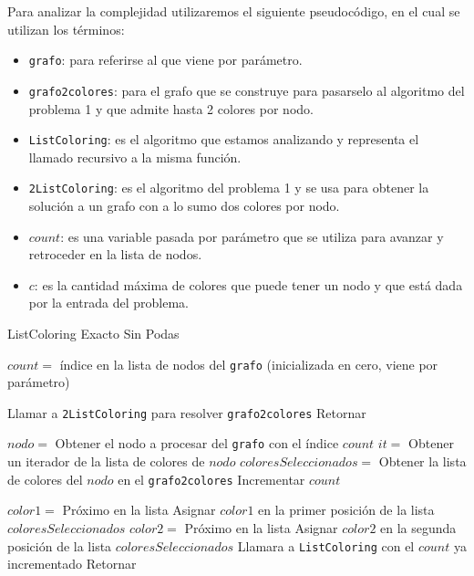 Para analizar la complejidad utilizaremos el siguiente pseudocódigo, en el cual se utilizan los términos:
\begin{itemize}
	\item \texttt{grafo}: para referirse al que viene por parámetro.
	
	\item \texttt{grafo2colores}: para el grafo que se construye para pasarselo al algoritmo del problema 1 y que admite hasta 2 colores por nodo.
	
	\item \texttt{ListColoring}: es el algoritmo que estamos analizando y representa el llamado recursivo a la misma función. 
	
	\item \texttt{2ListColoring}: es el algoritmo del problema 1 y se usa para obtener la solución a un grafo con a lo sumo dos colores por nodo.
	
	\item $count$: es una variable pasada por parámetro que se utiliza para avanzar y retroceder en la lista de nodos.
	
	\item $c$: es la cantidad máxima de colores que puede tener un nodo y que está dada por la entrada del problema.
\end{itemize}

\begin{algorithm}
\caption{ListColoring Exacto Sin Podas}
\label{lce}
\begin{algorithmic} 

\STATE $count = $ índice en la lista de nodos del \texttt{grafo} (inicializada en cero, viene por parámetro) 

	\STATE Llamar a \texttt{2ListColoring} para resolver \texttt{grafo2colores}  %
	\STATE Retornar 
\ENDIF

\STATE $nodo = $ Obtener el nodo a procesar del \texttt{grafo} con el índice $count$ 
\STATE $it = $ Obtener un iterador de la lista de colores de $nodo$ 
\STATE $coloresSeleccionados = $ Obtener la lista de colores del $nodo$ en el \texttt{grafo2colores} 
\STATE Incrementar $count$ 

	\STATE $color1 = $ Próximo en la lista 
	\STATE Asignar $color1$ en la primer posición de la lista $coloresSeleccionados$ 
		\STATE $color2 = $ Próximo en la lista 
		\STATE Asignar $color2$ en la segunda posición de la lista $coloresSeleccionados$ 
	\ENDIF
	\STATE Llamara a \texttt{ListColoring} con el $count$ ya incrementado %
\ENDWHILE
\STATE Retornar
\end{algorithmic}
\end{algorithm}

